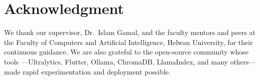 \chapter*{Acknowledgment}

We thank our supervisor, Dr.\ Islam Gamal, and the faculty mentors and peers at the
Faculty of Computers and Artificial Intelligence, Helwan University, for their
continuous guidance. We are also grateful to the open-source community whose tools
---Ultralytics, Flutter, Ollama, ChromaDB, LlamaIndex, and many others---made rapid
experimentation and deployment possible.
